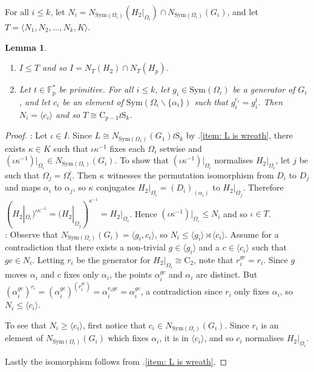 \documentclass[11pt,a4paper]{article}
\newtheorem{lemma}[theorem]{Lemma}
\theoremstyle{definition}
\theoremstyle{remark}
\newcommand{\Sym}[0]{\mathrm{Sym}}
\newcommand{\Sy}{\mathrm{S}}
\newcommand{\Cy}{\mathrm{C}}
\begin{document}
For all $i \leq k$, let $N_i = N_{\Sym(\Omega_i)}(H_2|_{\Omega_i}) \cap N_{\Sym(\Omega_i)}(G_i)$, and let $T = \langle N_1, N_2, \ldots, N_k, K \rangle$. %

\begin{lemma}\label{get N of T2} 
\begin{enumerate}
    \item \label{I in T} $I \leq T$ and so $I = N_T(H_2) \cap N_T(H_p)$.
    \item \label{intersection of norms is generated by ci } Let $t \in \mathds{F}_p^*$ be primitive. For all $i \leq k$, let $g_i \in \Sym(\Omega_i)$ be a generator of $G_i$, and let $c_i$ be an element of $\Sym(\Omega_i \backslash \{\alpha_i\})$ such that $g_i^{c_i} = g_i^t$. 
    Then $N_i = \langle c_i \rangle$ and %
    so $T \cong \Cy_{p-1} \wr \Sy_k$.
\end{enumerate}

\end{lemma}
\begin{proof}
: 
Let $\iota \in I$. Since $L \cong N_{\Sym(\Omega_1)}(G_1) \wr \Sy_k$ by .\ref{item: L is wreath}, there exists $\kappa \in K$ such that $\iota \kappa^{-1}$ fixes each $\Omega_i$ setwise and $(\iota \kappa^{-1})|_{\Omega_i} \in N_{\Sym(\Omega_i)}(G_i)$. 
To show that $(\iota \kappa^{-1})|_{\Omega_i}$ normalises $H_2|_{\Omega_i}$, 
let $j$ be such that $\Omega_j = \Omega_i^{\iota}$. 
Then $\kappa$ witnesses the permutation isomorphism from $D_i$ to $D_j$ and maps $\alpha_i$ to $\alpha_j$, so $\kappa$ conjugates $H_2|_{\Omega_i}= (D_i)_{(\alpha_i)}$ to $H_2|_{\Omega_j}$. 
Therefore $(H_2|_{\Omega_i})^{\iota \kappa^{-1}} = (H_2|_{\Omega_j})^{\kappa^{-1}} = H_2|_{\Omega_i}$. 
Hence $(\iota \kappa^{-1})|_{\Omega_i} \leq N_i$ and so $\iota \in T$.\\
: 
Observe that $N_{\Sym(\Omega_i)}(G_i) = \langle g_i, c_i \rangle$, so $N_i
 \leq \langle g_i\rangle \rtimes \langle  c_i \rangle $.
Assume for a contradiction that there exists a non-trivial $g \in \langle g_i \rangle$ and a $c \in \langle c_i \rangle$
such that $gc \in N_i$. Letting $r_i$ be the generator for $H_2|_{\Omega_i} \cong \Cy_2$, note that $r_i^{gc} = r_i$. Since $g$ moves $\alpha_i$ and $c$ fixes only $\alpha_i$, the points $\alpha_i^{gc}$ and $ \alpha_i$ are distinct. 
But $(\alpha_i^{gc})^{r_i} = (\alpha_i^{gc})^{(r_i^{gc})} = \alpha_i^{r_igc} = \alpha_i^{gc}$, a contradiction since $r_i$ only fixes $\alpha_i$, so $N_i \leq \langle c_i \rangle$.

To see that $N_i \geq \langle c_i \rangle$, first notice that $c_i \in N_{\Sym(\Omega_i)}(G_i)$. Since $r_i$ is an element of $N_{\Sym(\Omega_i)}(G_i)$ which fixes $\alpha_i$, it is in $\langle c_i \rangle$, and so $c_i$ normalises $H_2|_{\Omega_i}$. 

Lastly the isomorphism follows from .\ref{item: L is wreath}. 
\end{proof}
\end{document}
